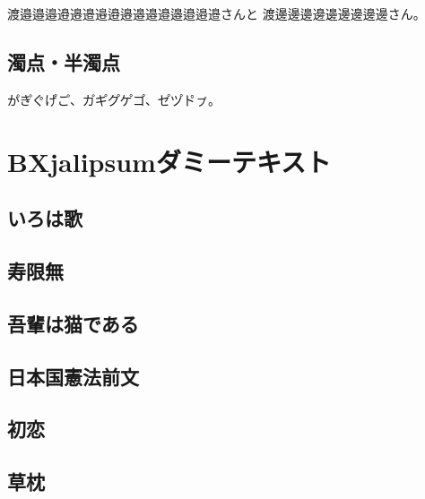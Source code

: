\documentclass[a4paper,twocolumn,tombow]{xltjtarticle}
\begin{document}
渡邉邉󠄀邉󠄁邉󠄂邉󠄃邉󠄄邉󠄅邉󠄆邉󠄇邉󠄈邉󠄉邉󠄊邉󠄋邉󠄌邉󠄍邉󠄎さんと
渡邊邊󠄀邊󠄁邊󠄂邊󠄃邊󠄄邊󠄅邊󠄆邊󠄇さん。

\subsection{濁点・半濁点}

か゚き゚く゚け゚こ゚、カ゚キ゚ク゚ケ゚コ゚、セ゚ツ゚ト゚ㇷ゚。

\newpage
\section{BXjalipsumダミーテキスト}

\subsection{いろは歌}

\subsection{寿限無}

\subsection{吾輩は猫である}

\subsection{日本国憲法前文}

\subsection{初恋}

\subsection{草枕}
\end{document}
